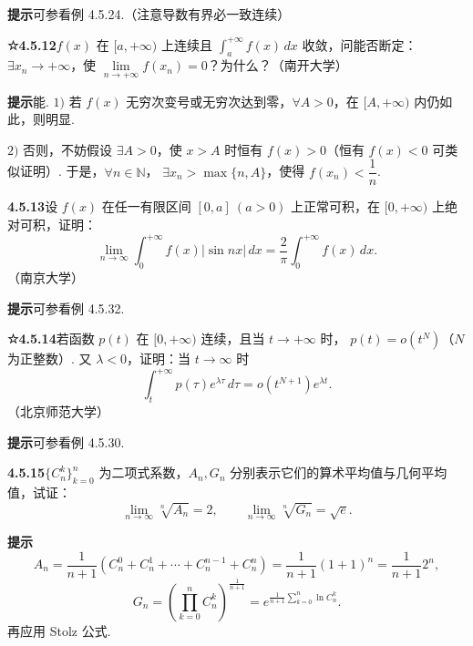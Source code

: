 \documentclass[UTF8, 12pt, fontset=fandol, oneside]{ctexart}
\begin{document}
\noindent\textbf{提示}\quad 可参看例 4.5.24.（注意导数有界必一致连续）

\noindent\textbf{☆4.5.12}\quad $f(x)$ 在 $[a,+\infty)$ 上连续且 $\displaystyle\int_a^{+\infty}f(x)\,dx$ 收敛，问能否断定：
$\exists x_n\to+\infty$，使 $\lim\limits_{n\to+\infty}f(x_n)=0$？为什么？（南开大学）

\noindent\textbf{提示}\quad 能. $1)$ 若 $f(x)$ 无穷次变号或无穷次达到零，$\forall A>0$，在 $[A,+\infty)$ 内仍如此，则明显.

$2)$ 否则，不妨假设 $\exists A>0$，使 $x>A$ 时恒有 $f(x)>0$（恒有 $f(x)<0$ 可类似证明）. 于是，$\forall n\in\mathbb N$，
$\exists x_n>\max\{n,A\}$，使得 $f(x_n)<\dfrac1n$.

\noindent\textbf{4.5.13}\quad 设 $f(x)$ 在任一有限区间 $[0,a]\ (a>0)$ 上正常可积，在 $[0,+\infty)$ 上绝对可积，证明：
\[
\lim_{n\to\infty}\int_0^{+\infty}f(x)|\sin nx|\,dx
=\frac2\pi\int_0^{+\infty}f(x)\,dx.
\]
（南京大学）

\noindent\textbf{提示}\quad 可参看例 4.5.32.

\noindent\textbf{☆4.5.14}\quad 若函数 $p(t)$ 在 $[0,+\infty)$ 连续，且当 $t\to+\infty$ 时，
$p(t)=o(t^N)$（$N$ 为正整数）. 又 $\lambda<0$，证明：当 $t\to\infty$ 时
\[
\int_t^{+\infty}p(\tau)e^{\lambda\tau}\,d\tau=o(t^{N+1})e^{\lambda t}.
\]
（北京师范大学）

\noindent\textbf{提示}\quad 可参看例 4.5.30.

\noindent\textbf{4.5.15}\quad $\{C_n^k\}_{k=0}^n$ 为二项式系数，$A_n,G_n$ 分别表示它们的算术平均值与几何平均值，试证：
\[
\lim_{n\to\infty}\sqrt[n]{A_n}=2,\qquad
\lim_{n\to\infty}\sqrt[n]{G_n}=\sqrt e.
\]

\noindent\textbf{提示}\quad
\[
A_n=\frac1{n+1}(C_n^0+C_n^1+\cdots+C_n^{n-1}+C_n^n)
=\frac1{n+1}(1+1)^n=\frac1{n+1}2^n,
\]
\begin{equation}
G_n=\left(\prod_{k=0}^n C_n^k\right)^{\frac1{n+1}}
=e^{\frac1{n+1}\sum_{k=0}^n\ln C_n^k}. \tag{1}
\end{equation}
再应用 Stolz 公式.
\end{document}
